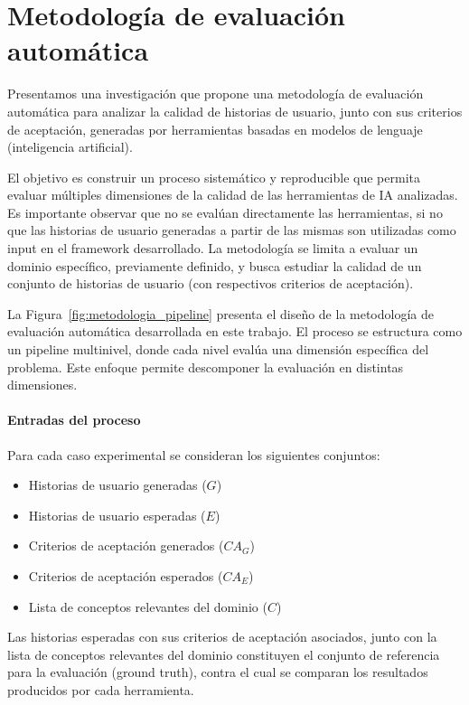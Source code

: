 \section{Metodología de evaluación automática}
\label{sec:metodologia_evaluacion}
Presentamos una investigación que propone una metodología de evaluación automática para analizar la calidad de historias de usuario, junto con sus criterios de aceptación, generadas por herramientas basadas en modelos de lenguaje (inteligencia artificial).

El objetivo es construir un proceso sistemático y reproducible que permita evaluar múltiples dimensiones de la calidad de las herramientas de IA analizadas. Es importante observar que no se evalúan directamente las herramientas, si no que las historias de usuario generadas a partir de las mismas son utilizadas como input en el framework desarrollado. La metodología se limita a evaluar un dominio específico, previamente definido, y busca estudiar la calidad de un conjunto de historias de usuario (con respectivos criterios de aceptación).

La Figura~\ref{fig:metodologia_pipeline} presenta el diseño de la metodología
de evaluación automática desarrollada en este trabajo.
El proceso se estructura como un pipeline multinivel, donde cada nivel evalúa una dimensión específica del problema. Este enfoque permite descomponer la evaluación en distintas dimensiones.

\paragraph{Entradas del proceso}

Para cada caso experimental se consideran los siguientes conjuntos:

\begin{itemize}
    \item Historias de usuario generadas ($G$)
    \item Historias de usuario esperadas ($E$)
    \item Criterios de aceptación generados ($CA_G$)
    \item Criterios de aceptación esperados ($CA_E$)
    \item Lista de conceptos relevantes del dominio ($C$)
\end{itemize}

Las historias esperadas con sus criterios de aceptación asociados, junto con la lista de conceptos relevantes del dominio constituyen el
conjunto de referencia para la evaluación (ground truth), contra el cual se
comparan los resultados producidos por cada herramienta.

